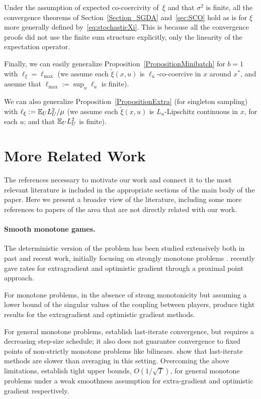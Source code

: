 \documentclass{article}
\begin{document}
Under the assumption of expected co-coercivity of~$\xi$ and that $\sigma^2$ is finite, all the convergence theorems of Section~\ref{Section_SGDA} and~\ref{sec:SCO} hold as is for $\xi$ more generally defined by~\eqref{eq:stochasticXi}. This is because all the convergence proofs did not use the finite sum structure explicitly, only the linearity of the expectation operator.

Finally, we can easily generalize Proposition~\ref{PropositionMinibatch} for $b=1$ with $\ell_\xi = \ell_{\max}$ (we assume each $\tilde{\xi}(x,u)$ is $\ell_u$-co-coercive in $x$ around $x^*$, and assume that $\ell_{\max} := \sup_{u} \ell_u$ is finite).

We can also generalize Proposition~\ref{PropositionExtra} (for singleton sampling) with $\ell_\xi := \mathbb{E}_U L_U^2 / \mu$ (we assume each $\tilde{\xi}(x,u)$ is $L_u$-Lipschitz continuous in $x$, for each $u$; and that $\mathbb{E}_U L_U^2$ is finite).

\section{More Related Work}
\label{Appendix_MoreRelatedWork}

The references necessary to motivate our work and connect it to the most relevant literature is included in the appropriate sections of the main body of the paper. Here we present a broader view of the literature, including some more references to papers of the area that are not directly related with our work.

\paragraph{Smooth monotone games.} 
The deterministic version of the problem has been studied extensively both in past and recent work, initially focusing on strongly monotone problems
\citep{tseng1995linear, gidel2018variational, liang2019interaction, azizian2019tight, zhou2021robust}.
\citet{mokhtari2020unified} recently gave rates for extragradient and optimistic gradient through a proximal point approach. 

For monotone problems, in the absence of strong monotonicity but assuming a lower bound of the singular values of the coupling between players, \citet{azizian2019tight} produce tight results for the extragradient and optimistic gradient methods.

For general monotone problems, \citet{mertikopoulos2019games} establish last-iterate convergence, but requires a decreasing step-size schedule; it also does not guarantee convergence to fixed points of non-strictly monotone problems like bilinears. 	
\citet{golowich2020last} show that last-iterate methods are slower than averaging in this setting.
Overcoming the above limitations, \citet{golowich2020last, golowich2020tight} establish tight upper bounds, $O(1/\sqrt{T})$, for general monotone problems under a weak smoothness assumption for extra-gradient and optimistic gradient respectively.
\end{document}
